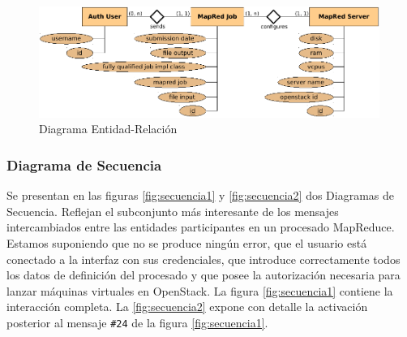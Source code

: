 \begin{figure}[tbp]
\begin{center}
\includegraphics[width=0.99\textwidth]{imagenes/032.pdf}
 \caption{Diagrama Entidad-Relaci\'on}
\label{fig:entidadrelacion}
\end{center}
\end{figure}


\subsubsection{Diagrama de Secuencia}\label{subsubsec:secuencia}

\noindent Se presentan en las figuras \ref{fig:secuencia1} y \ref{fig:secuencia2} dos Diagramas de Secuencia. Reflejan el subconjunto m\'as interesante de los mensajes intercambiados entre las entidades participantes en un procesado MapReduce. Estamos suponiendo que no se produce ning\'un error, que el usuario est\'a conectado a la interfaz con sus credenciales, que introduce correctamente todos los datos de definici\'on del procesado y que posee la autorizaci\'on necesaria para lanzar m\'aquinas virtuales en OpenStack. La figura \ref{fig:secuencia1} contiene la interacci\'on completa. La \ref{fig:secuencia2} expone con detalle la activaci\'on posterior al mensaje \texttt{\#24} de la figura \ref{fig:secuencia1}.

